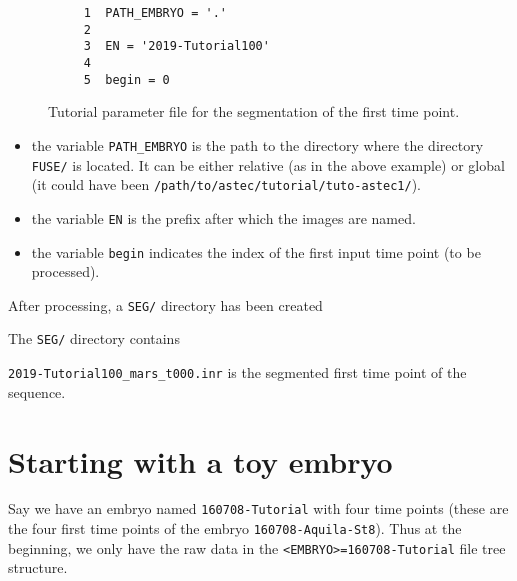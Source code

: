 \begin{figure}
\begin{framed}
\begin{verbatim}
     1	PATH_EMBRYO = '.'
     2	
     3	EN = '2019-Tutorial100'
     4	
     5	begin = 0
\end{verbatim}
\end{framed}
\caption{\label{fig:tutorial:parameter:mars} Tutorial
  parameter file for the segmentation of the first time point.}
\end{figure}


\begin{itemize}
  \item the variable \texttt{PATH\_EMBRYO} is the path to the directory where
    the directory \texttt{FUSE/} is located. It can be either relative (as in the
    above example) or
    global (it could have been \texttt{/path/to/astec/tutorial/tuto-astec1/}).
  \item the variable \texttt{EN} is the prefix after which the  images
    are named. 
  \item the variable \texttt{begin} indicates  the
    index of the first input time point (to be processed).
\end{itemize}

After processing, a \texttt{SEG/} directory has been created

\mbox{}
\mbox{}

The \texttt{SEG/} directory contains

\mbox{}
\mbox{}

\texttt{2019-Tutorial100\_mars\_t000.inr} is the segmented first
  time point of the sequence.





\pagebreak



\section{Starting with a toy embryo}

Say we have an embryo named \texttt{160708-Tutorial} with four time points (these are the four first time points of the embryo \texttt{160708-Aquila-St8}). Thus at the beginning, we only have the raw data in the \texttt{<EMBRYO>=160708-Tutorial} file tree structure.











